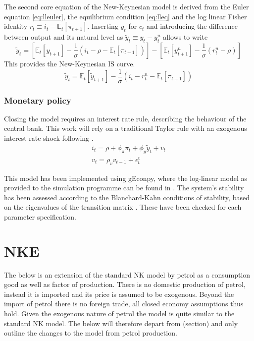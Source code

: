 \documentclass[12pt,a4paper,english]{article} %
\newcommand{\E}{\mathbb{E}} %
\let\oldsection\section
\renewcommand\section{\clearpage\oldsection}
\begin{document}
	The second core equation of the New-Keynesian model is derived from the Euler equation \eqref{eq:lleuler}, the equilibrium condition \eqref{eq:lleq} and the log linear Fisher identity $r_t \equiv i_t - \E_t[\pi_{t+1}]$. Inserting $y_t$ for $c_t$ and introducing the difference between output and its natural level as $\tilde{y}_t \equiv y_t - y_t^n$ allows to write
	\begin{equation}
		\tilde{y}_t = 
		\left[
		\E_t[y_{t+1}] - \frac{1}{\sigma} (i_t - \rho - \E_t[\pi_{t+1}])
		\right]
		-
		\left[
		\E_t[y_{t+1}^n] - \frac{1}{\sigma} (r_t^n - \rho)
		\right]
	\end{equation}
	This provides the New-Keynesian IS curve.
	\begin{equation} \label{eq:llnkis}
		\tilde{y}_t = \E_t[\tilde{y}_{t+1}] - \frac{1}{\sigma} (i_t - r_t^n - \E_t[\pi_{t+1}])
	\end{equation}
	\subsubsection{Monetary policy}
	Closing the model requires an interest rate rule, describing the behaviour of the central bank. This work will rely on a traditional Taylor rule with an exogenous interest rate shock following \cite{gali_monetary_2008}.
	\begin{equation}
		\begin{aligned}
			i_t = \rho + \phi_{\pi} \pi_t + \phi_{y} \tilde{y}_t + v_t \\
			v_t = \rho_v v_{t-1} + \epsilon_t^v
		\end{aligned}
	\end{equation}

	This model has been implemented using gEconpy, where the log-linear model as provided to the simulation programme can be found in . The system's stability has been assessed according to the Blanchard-Kahn conditions of stability, based on the eigenvalues of the transition matrix \cite{blanchard_solution_1980}. These have been checked for each parameter specification.

	\section{NKE}
	The below is an extension of the standard NK model by petrol as a consumption good as well as factor of production. There is no domestic production of petrol, instead it is imported and its price is assumed to be exogenous. Beyond the import of petrol there is no foreign trade, all closed economy assumptions thus hold. 
	Given the exogenous nature of petrol the model is quite similar to the standard NK model. The below will therefore depart from (section) and only outline the changes to the model from petrol production. 	
	
\end{document}
